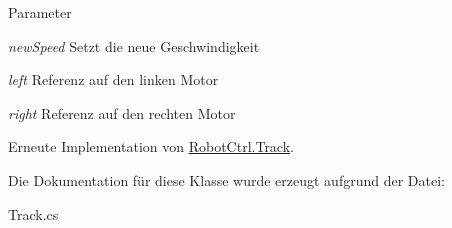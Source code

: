 \begin{DoxyParams}{Parameter}
\item[{\em newSpeed}]Setzt die neue Geschwindigkeit \item[{\em left}]Referenz auf den linken Motor \item[{\em right}]Referenz auf den rechten Motor \end{DoxyParams}


Erneute Implementation von \hyperlink{class_robot_ctrl_1_1_track_a9abc3ccf4bf1d9db8d461f2cb4b4b0d3}{RobotCtrl.Track}.



Die Dokumentation für diese Klasse wurde erzeugt aufgrund der Datei:\begin{DoxyCompactItemize}
\item 
Track.cs\end{DoxyCompactItemize}
